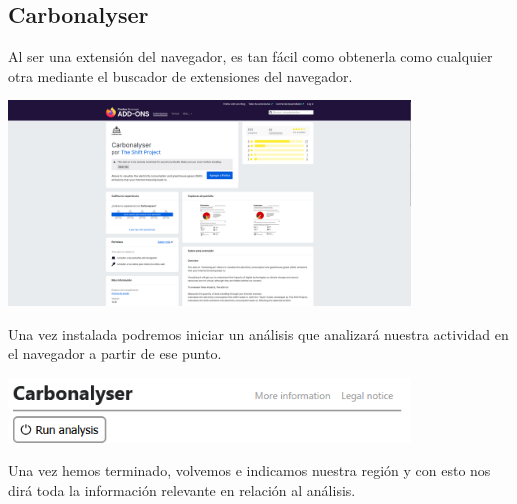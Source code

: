 \documentclass[12pt,a4paper]{report}
\begin{document}
\subsection{Carbonalyser}
Al ser una extensión del navegador, es tan fácil como obtenerla como cualquier
otra mediante el buscador de extensiones del navegador.

\begin{center}
  \includegraphics[width=0.8\textwidth]{imagenes/Carbonalyser_1.png}
\end{center}

Una vez instalada podremos iniciar un análisis que analizará nuestra actividad
en el navegador a partir de ese punto.

\begin{center}
  \includegraphics[width=0.8\textwidth]{imagenes/Carbonalyser_2.png}
\end{center}

Una vez hemos terminado, volvemos e indicamos nuestra región y con esto nos
dirá toda la información relevante en relación al análisis.
\end{document}
